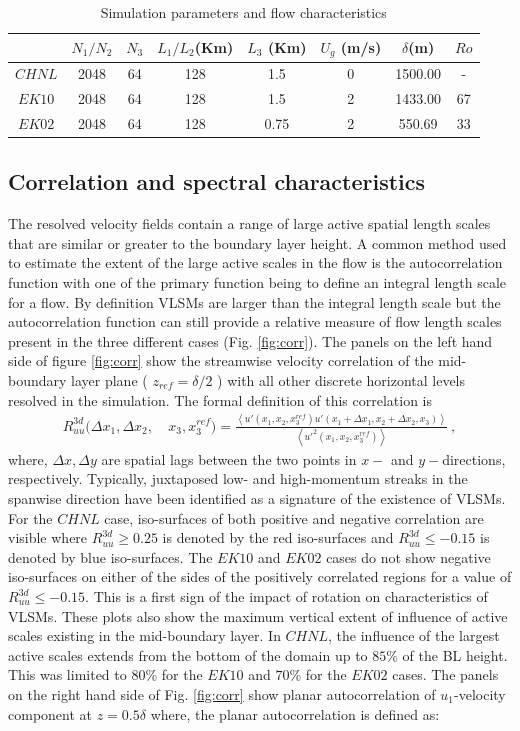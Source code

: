 \documentclass{amsart}
\begin{document}
\begin{table}[ht]
\caption{Simulation parameters and flow characteristics}
  \begin{tabular}{ c c c  c c c c  c }
  \hline 
   & $N_1/N_2$ & $N_3$ & $L_1/L_2$(Km) & $L_3$ (Km) & $U_g$ (m/s)  & $\delta$(m) & $Ro$ \\
  \hline  
   $CHNL$ & 2048 &  64 & 128 &  1.5 & 0   & 1500.00 & - \\
   $EK10$ & 2048 &  64 & 128 &  1.5 & 2   & 1433.00 & 67  \\
   $EK02$ & 2048 &  64 & 128 &  0.75 & 2  & 550.69 & 33  \\
  \hline 
  \hline 
\end{tabular}
\label{tab:sim_param}
\end{table}
\subsection{Correlation and spectral characteristics}
The resolved velocity fields contain a  range of large active spatial length scales that are similar or greater to the boundary layer height. A common method used to estimate the extent of the large active scales in the flow is the autocorrelation function with one of the primary function being to define an integral length scale for a flow. By definition VLSMs are larger than the integral length scale but the autocorrelation function can still provide a relative measure of flow length scales present in the three different cases (Fig. \ref{fig:corr}). The panels on the left hand side of figure \ref{fig:corr} show the streamwise velocity correlation of the mid-boundary layer plane ( $z_{ref}=\delta/2$ ) with all other discrete horizontal levels resolved in the simulation. The formal definition of this correlation is 
\begin{align}
 R_{uu}^{3d}(\Delta x_1, \Delta x_2,\ & x_3, x_3^{ref})   =   \frac{\left < u'(x_1, x_2, x_3^{ref})u'(x_1 + \Delta x_1, x_2 + \Delta x_2, x_3) \right >}{\left < u'^{2}(x_1,x_2,x_3^{ref})\right >} \ ,
\label{eqn:3d_corr} 
\end{align}
where, $\Delta x, \Delta y$ are spatial lags between the two points in $x-$ and $y-$directions, respectively. Typically,  juxtaposed low- and high-momentum streaks  in the spanwise direction have been identified as a signature of the existence of VLSMs. For the $CHNL$ case, iso-surfaces of both positive and negative correlation are visible where $R_{uu}^{3d}\geq 0.25$ is denoted by the red iso-surfaces and $R_{uu}^{3d}\leq -0.15$ is denoted by blue iso-surfaces. The $EK10$ and $EK02$ cases do not show negative iso-surfaces on either of the sides of the positively correlated regions for a value of $R_{uu}^{3d}\leq -0.15$. This is a  first sign of the impact of rotation on characteristics of VLSMs. These plots also show the maximum vertical extent of influence of active scales existing in the mid-boundary layer. In $CHNL$, the influence of the largest active scales extends from the bottom of the domain up to   $85\%$ of the BL height. This was limited to $80\%$ for the $EK10$ and $70\%$ for the $EK02$ cases.  The panels on the right hand side of Fig. \ref{fig:corr} show planar autocorrelation of $u_1$-velocity component at $ z=0.5\delta$ where, the planar autocorrelation is defined as: 
\end{document}
